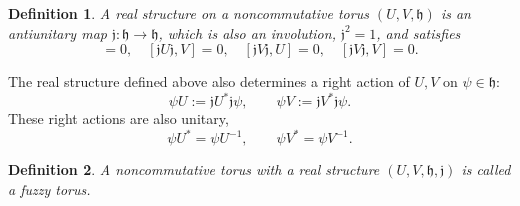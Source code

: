 \documentclass[a4paper,11pt]{article}
\newtheorem{definition}{Definition}
\begin{document}
\begin{definition}
  \cite{Bigatti1} A real structure on a noncommutative torus $(U, V, \mathfrak{h})$
  is an antiunitary map $\mathfrak{j}: \mathfrak{h} \rightarrow \mathfrak{h}$,
  which is also an involution, $\mathfrak{j}^2 = 1$, and satisfies
  \begin{equation}
    [\mathfrak{j}U\mathfrak{j}, U] = 0, \quad [\mathfrak{j}U\mathfrak{j}, V] =
    0, \quad [\mathfrak{j}V\mathfrak{j}, U] = 0, \quad
    [\mathfrak{j}V\mathfrak{j}, V] = 0.
  \end{equation}
\end{definition}

The real structure defined above also determines a right action of $U, V$ on
$\psi \in \mathfrak{h}$:
\begin{equation}
  \psi U := \mathfrak{j}U^{\ast} \mathfrak{j} \psi, \qquad \psi V :=
  \mathfrak{j}V^{\ast} \mathfrak{j} \psi .
\end{equation}
These right actions are also unitary,
\begin{equation}
  \psi U^{\ast} = \psi U^{- 1}, \qquad \psi V^{\ast} = \psi V^{- 1} .
\end{equation}
\begin{definition}
  \cite{Bigatti1} A noncommutative torus with a real structure $(U, V,
  \mathfrak{h}, \mathfrak{j})$ is called a fuzzy torus.
\end{definition}
\end{document}
